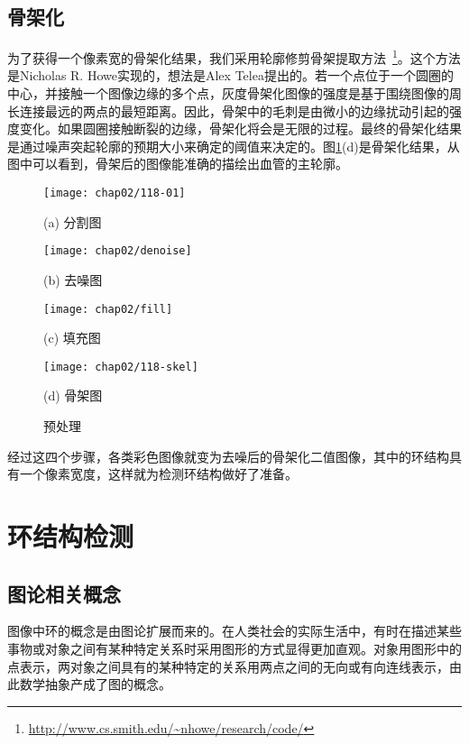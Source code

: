 \subsection{骨架化}
为了获得一个像素宽的骨架化结果，我们采用轮廓修剪骨架提取方法~\footnote{\url{http://www.cs.smith.edu/~nhowe/research/code/}}。这个方法是Nicholas R. Howe实现的，想法是Alex Telea提出的。若一个点位于一个圆圈的中心，并接触一个图像边缘的多个点，灰度骨架化图像的强度是基于围绕图像的周长连接最远的两点的最短距离。因此，骨架中的毛刺是由微小的边缘扰动引起的强度变化。如果圆圈接触断裂的边缘，骨架化将会是无限的过程。最终的骨架化结果是通过噪声突起轮廓的预期大小来确定的阈值来决定的。图\ref{fig:Preprocessing}(d)是骨架化结果，从图中可以看到，骨架后的图像能准确的描绘出血管的主轮廓。
\begin{figure}[H]
\centering
  \begin{minipage}[b]{0.48\textwidth}
    \centering
    \texttt{[image: chap02/118-01]}
      \centerline{(a) 分割图}\medskip
  \end{minipage}
  \begin{minipage}[b]{0.48\textwidth}
    \centering
    \texttt{[image: chap02/denoise]}
      \centerline{(b) 去噪图}\medskip
  \end{minipage}
  \begin{minipage}[b]{0.48\textwidth}
    \centering
    \texttt{[image: chap02/fill]}
      \centerline{(c) 填充图}\medskip
  \end{minipage}
  \begin{minipage}[b]{0.48\textwidth}
    \centering
    \texttt{[image: chap02/118-skel]}
      \centerline{(d) 骨架图}\medskip
  \end{minipage}
\caption{预处理}
\label{fig:Preprocessing}
\end{figure}

经过这四个步骤，各类彩色图像就变为去噪后的骨架化二值图像，其中的环结构具有一个像素宽度，这样就为检测环结构做好了准备。

\section{环结构检测}
\label{}
\subsection{图论相关概念}
\label{}

图像中环的概念是由图论扩展而来的。在人类社会的实际生活中，有时在描述某些事物或对象之间有某种特定关系时采用图形的方式显得更加直观。对象用图形中的点表示，两对象之间具有的某种特定的关系用两点之间的无向或有向连线表示，由此数学抽象产成了图的概念。

